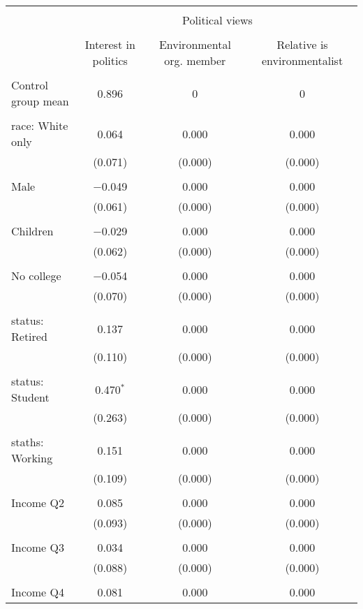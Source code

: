 
\begin{tabular}{@{\extracolsep{5pt}}lccc} 
\\[-1.8ex]\hline 
\hline \\[-1.8ex] 
 & \multicolumn{3}{c}{Political views} \\ 
\cline{2-4} 
\\[-1.8ex] & Interest in politics & Environmental org. member & Relative is environmentalist \\ 
\hline \\[-1.8ex] 
 Control group mean & 0.896 & 0 & 0  \\ \hline \\[-1.8ex] race: White only & 0.064 & 0.000 & 0.000 \\ 
  & (0.071) & (0.000) & (0.000) \\ 
  & & & \\ 
 Male & $-$0.049 & 0.000 & 0.000 \\ 
  & (0.061) & (0.000) & (0.000) \\ 
  & & & \\ 
 Children & $-$0.029 & 0.000 & 0.000 \\ 
  & (0.062) & (0.000) & (0.000) \\ 
  & & & \\ 
 No college & $-$0.054 & 0.000 & 0.000 \\ 
  & (0.070) & (0.000) & (0.000) \\ 
  & & & \\ 
 status: Retired & 0.137 & 0.000 & 0.000 \\ 
  & (0.110) & (0.000) & (0.000) \\ 
  & & & \\ 
 status: Student & 0.470$^{*}$ & 0.000 & 0.000 \\ 
  & (0.263) & (0.000) & (0.000) \\ 
  & & & \\ 
 staths: Working & 0.151 & 0.000 & 0.000 \\ 
  & (0.109) & (0.000) & (0.000) \\ 
  & & & \\ 
 Income Q2 & 0.085 & 0.000 & 0.000 \\ 
  & (0.093) & (0.000) & (0.000) \\ 
  & & & \\ 
 Income Q3 & 0.034 & 0.000 & 0.000 \\ 
  & (0.088) & (0.000) & (0.000) \\ 
  & & & \\ 
 Income Q4 & 0.081 & 0.000 & 0.000 \\ 

\end{tabular}
